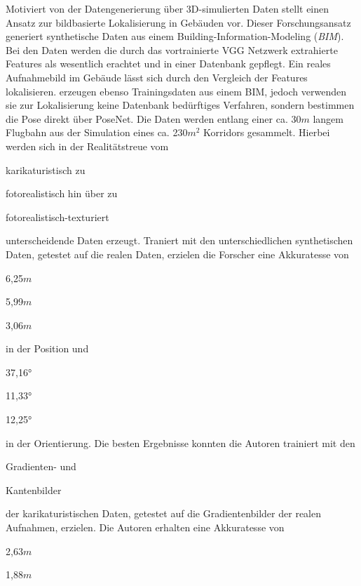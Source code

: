 Motiviert von der Datengenerierung über 3D-simulierten Daten stellt \citet{haImagebasedIndoorLocalization2018} einen Ansatz zur bildbasierte Lokalisierung in Gebäuden vor. Dieser Forschungsansatz generiert synthetische Daten aus einem Building-Information-Modeling (\textit{BIM}). Bei den Daten werden die durch das vortrainierte VGG Netzwerk \cite{simonyanVeryDeepConvolutional2014} extrahierte Features als wesentlich erachtet und in einer Datenbank gepflegt. Ein reales Aufnahmebild im Gebäude lässt sich durch den Vergleich der Features lokalisieren. \citet{acharyaBIMPoseNetIndoorCamera2019, acharyaMODELLINGUNCERTAINTYSINGLE2019} erzeugen ebenso Trainingsdaten aus einem BIM, jedoch verwenden sie zur Lokalisierung keine Datenbank bedürftiges Verfahren, sondern bestimmen die Pose direkt über PoseNet. Die Daten werden entlang einer ca. 30$m$ langem Flugbahn aus der Simulation eines ca. 230$m^2$  Korridors gesammelt. Hierbei werden sich in der Realitätstreue vom \begin{enumerate*}[label=\alph*)]
	\item karikaturistisch zu
	\item fotorealistisch hin über zu
	\item fotorealistisch-texturiert
\end{enumerate*} unterscheidende Daten erzeugt.
Traniert mit den unterschiedlichen synthetischen Daten, getestet auf die realen Daten, erzielen die Forscher eine Akkuratesse von
\begin{enumerate*}[label=\alph*)]
	\item 6,25$m$
	\item 5,99$m$
	\item 3,06$m$
\end{enumerate*}
 in der Position und  
 \begin{enumerate*}[label=\alph*)]
 	\item 37,16°
 	\item 11,33°
 	\item 12,25°
 \end{enumerate*}
 in der Orientierung.
Die besten Ergebnisse konnten die Autoren trainiert mit den 
\begin{enumerate*}[label=\alph*)]
	\addtocounter{enumi}{3}
	\item Gradienten- und
	\item Kantenbilder
\end{enumerate*} der karikaturistischen Daten, getestet auf die Gradientenbilder der realen Aufnahmen, erzielen. Die Autoren erhalten eine Akkuratesse von 
\begin{enumerate*}[label=\alph*)]
	\addtocounter{enumi}{3}
	\item 2,63$m$
	\item 1,88$m$
\end{enumerate*}
